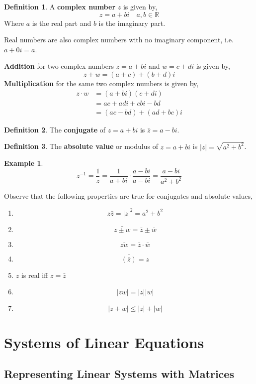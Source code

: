 \documentclass{report}
\theoremstyle{definition}
\newtheorem{_def}{Definition}
\newtheorem{ex}{Example}
\begin{document}
\begin{_def}
A \textbf{complex number} $z$ is given by,
\[z=a+bi \quad a,b\in \mathbb{R}\]
Where $a$ is the real part and $b$ is the imaginary part.
\end{_def}

Real numbers are also complex numbers with no imaginary component, i.e. $a+0i=a$. \newline

\textbf{Addition} for two complex numbers $z=a+bi$ and $w=c+di$ is given by,
\[z+w=(a+c)+(b+d)i\]
\textbf{Multiplication} for the same two complex numbers is given by,
\begin{align*}
z\cdot w &= (a+bi)(c+di) \\
&= ac+adi+cbi-bd \\
&= (ac-bd)+(ad+bc)i
\end{align*}

\begin{_def}
The \textbf{conjugate} of $z=a+bi$ is $\bar{z}=a-bi$.
\end{_def}

\begin{_def}
The \textbf{absolute value} or modulus of $z=a+bi$ is $|z|=\sqrt{a^2+b^2}$.
\end{_def}

\begin{ex}
\[z^{-1}=\frac{1}{z}=\frac{1}{a+bi}\cdot\frac{a-bi}{a-bi}=\frac{a-bi}{a^2+b^2}\]
\end{ex}

Observe that the following properties are true for conjugates and absolute values,
\begin{enumerate}
 \item \[z\bar{z}=|z|^2=a^2+b^2\]
 \item \[\bar{z\pm w}=\bar{z}\pm \bar{w}\]
 \item \[\bar{zw}=\bar{z}\cdot \bar{w}\]
 \item \[\bar{(\bar{z})}=z\]
 \item $z$ is real iff $z=\bar{z}$
 \item \[|zw|=|z||w|\]
 \item \[|z+w|\leq |z|+|w|\]
\end{enumerate}

\chapter{Systems of Linear Equations}

\section{Representing Linear Systems with Matrices}
\end{document}
